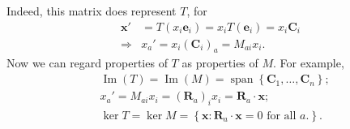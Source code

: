 \documentclass[10pt]{article}
\DeclareMathOperator{\spn}{span}
\DeclareMathOperator{\im}{Im}
\begin{document}
    Indeed, this matrix does represent $T$, for 
    \[
        \begin{aligned}
            \mathbf{x}'&=T(x_i \mathbf{e}_i)=x_iT(\mathbf{e}_i)=x_i \mathbf{C}_i \\
            \Longrightarrow & x_a'=x_i (\mathbf{C}_i)_a=M_{ai}x_i.
        \end{aligned}
    \]
    Now we can regard properties of $T$ as properties of $M$. For example, 
    \[
        \begin{aligned}
             & \im(T)=\im(M)=\spn\left\{ \mathbf{C}_1,\dots, \mathbf{C}_n\right\};\\
             & x_a'=M_{ai}x_i=(\mathbf{R}_{a})_ix_i= \mathbf{R}_a\cdot \mathbf{x};\\
             & \ker T = \ker M=\left\{ \mathbf{x}:\mathbf{R}_a\cdot \mathbf{x}=0 \text{ for all }a.\right\}.\\
        \end{aligned}
    \]
\end{document}
